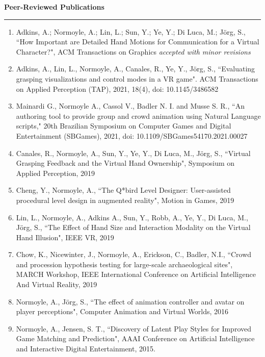 {\Large {\bf  Peer-Reviewed Publications}}
\vspace{0.1cm}
\hrule
\medskip

\begin{enumerate}[leftmargin=*]
\item Adkins, A.; Normoyle, A.; Lin, L.; Sun, Y.; Ye, Y.; Di Luca, M.; J\"{o}rg, S., ``How Important are Detailed Hand Motions for Communication for a Virtual Character?", ACM Transactions on Graphics \emph{accepted with minor revisions}

\item Adkins, A., Lin, L., Normoyle, A., Canales, R., Ye, Y., J\"{o}rg, S., ``Evaluating grasping visualizations and control modes in a VR game". ACM Transactions on Applied Perception (TAP), 2021, 18(4), doi: 10.1145/3486582

\item Mainardi G., Normoyle A., Cassol V., Badler N. I. and Musse S. R., ``An authoring tool to provide group and crowd animation using Natural Language scripts," 20th Brazilian Symposium on Computer Games and Digital Entertainment (SBGames), 2021, doi: 10.1109/SBGames54170.2021.00027

\item Canales, R., Normoyle, A., Sun, Y., Ye, Y., Di Luca, M., J\"{o}rg, S., ``Virtual Grasping Feedback and the Virtual Hand Ownership", Symposium on Applied Perception, 2019 

\item Cheng, Y., Normoyle, A., ``The Q*bird Level Designer: User-assisted procedural level design in augmented reality", Motion in Games, 2019 

\item Lin, L., Normoyle, A., Adkins A., Sun, Y., Robb, A., Ye, Y., Di Luca, M., J\"{o}rg, S., ``The Effect of Hand Size and Interaction Modality on the Virtual Hand Illusion", IEEE VR, 2019

\item Chow, K., Nicewinter, J., Normoyle, A., Erickson, C., Badler, N.I., ``Crowd and procession hypothesis testing for large-scale archaeological sites", MARCH Workshop, IEEE International Conference on Artificial Intelligence And Virtual Reality, 2019

\item Normoyle, A., J\"{o}rg, S., ``The effect of animation controller and avatar on player perceptions", 
Computer Animation and Virtual Worlds, 2016 

\item Normoyle, A., Jensen, S. T., ``Discovery of Latent Play Styles for Improved Game Matching and Prediction", 
AAAI Conference on Artificial Intelligence and Interactive Digital Entertainment, 2015.


\end{enumerate}
